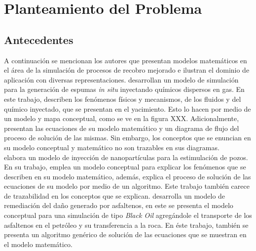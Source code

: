 

\chapter{Planteamiento del Problema}
%
\section{Antecedentes}

A continuación se mencionan los autores que presentan modelos matemáticos en el área de la simulación de procesos de recobro mejorado e ilustran el dominio de aplicación con diversas representaciones. \cite{ValenciaJD2016, valencia2018development} desarrollan un modelo de simulación para la generación de espumas \textit{in situ} inyectando químicos dispersos en gas. En este trabajo, describen los fenómenos físicos y mecanismos, de los fluidos y del químico inyectado, que se presentan en el yacimiento. Esto lo hacen por medio de un modelo y mapa conceptual, como se ve en la figura XXX. Adicionalmente, presentan las ecuaciones de su modelo matemático y un diagrama de flujo del proceso de solución de las mismas. Sin embargo, los conceptos que se enuncian en su modelo conceptual y matemático no son trazables en sus diagramas.\\

\cite{MozoID2017} elabora un modelo de inyección de nanopartículas para la estimulación de pozos. En su trabajo, emplea un modelo conceptual para explicar los fenómenos que se describen en su modelo matemático, además, explica el proceso de solución de las ecuaciones de su modelo por medio de un algoritmo. Este trabajo también carece de trazabilidad en los conceptos que se explican. \cite{IsazaCN2017} desarrolla un modelo de remediación del daño generado por asfaltenos, en este se presenta el modelo conceptual para una simulación de tipo \textit{Black Oil} agregándole el transporte de los asfaltenos en el petróleo y su transferencia a la roca. En éste trabajo, también se presenta un algoritmo genérico de solución de las ecuaciones que se muestran en el modelo matemático.\\

